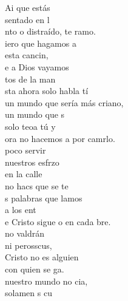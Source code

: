\documentclass[12pt]{article}
\begin{document}
\begin{multicols*}{2}
\begin{cancion}%
	Ai que estás \\
	sentado en l     \\
	nto o distraído, te ramo.\\
	iero que hagamos a \\
	esta cancin,\\
	e a Dios vayamos \\
	tos de la man\\
	sta ahora solo habla tí\\
	un mundo que sería más criano,\\
	 un mundo que s  \\
	solo teoa tú y \\
	ora no hacemos a por camrlo.\\
	 poco servir \\
	nuestros esfrzo\\
	en la calle \\
	no hacs que se te\\
	s palabras que lamos \\
	a los ent\\
	e Cristo sigue o en cada bre.\\
	 no valdrán \\
	ni perosscus, \\
	 Cristo no es alguien \\
	con quien se ga.\\
	 nuestro mundo no cia, \\
	solamen s cu  \\

\end{cancion}
\end{multicols*}
\end{document}
